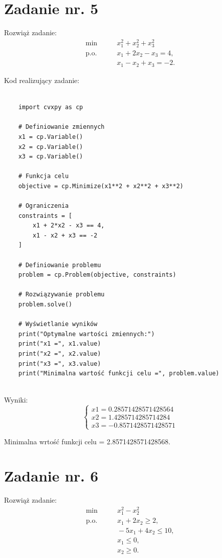 \documentclass{article}
\begin{document}
\section{Zadanie nr. 5}

Rozwiąż zadanie:\\
\begin{align*}
    \min &\qquad x_1^2 + x_2^2 + x_3^2 \\
    \text{p.o.} &\qquad x_1 + 2x_2 - x_3 = 4, \\
    &\qquad x_1 -x_2 +x_3 = -2.
    \end{align*}


Kod realizujący zadanie:
\begin{lstlisting}
    
    import cvxpy as cp

    # Definiowanie zmiennych
    x1 = cp.Variable()
    x2 = cp.Variable()
    x3 = cp.Variable()
    
    # Funkcja celu
    objective = cp.Minimize(x1**2 + x2**2 + x3**2)
    
    # Ograniczenia
    constraints = [
        x1 + 2*x2 - x3 == 4,
        x1 - x2 + x3 == -2
    ]
    
    # Definiowanie problemu
    problem = cp.Problem(objective, constraints)
    
    # Rozwiązywanie problemu
    problem.solve()
    
    # Wyświetlanie wyników
    print("Optymalne wartości zmiennych:")
    print("x1 =", x1.value)
    print("x2 =", x2.value)
    print("x3 =", x3.value)
    print("Minimalna wartość funkcji celu =", problem.value)
    

\end{lstlisting}

Wyniki:
\begin{equation}
    \begin{cases}
        x1=0.28571428571428564\\
        x2=1.4285714285714284\\
        x3=-0.8571428571428571
    \end{cases}
\end{equation}

Minimalna wrtość funkcji celu = 2.8571428571428568.
\section{Zadanie nr. 6}

Rozwiąż zadanie:\\
\begin{align*}
    \min &\qquad x_1^2 - x_2^2 \\
    \text{p.o.} &\qquad x_1 + 2x_2 \geq 2, \\
    &\qquad -5x_1 +4x_2 \leq 10,\\
    &\qquad x_1 \leq 0, \\
    &\qquad x_2 \geq 0.
    \end{align*}
\end{document}
